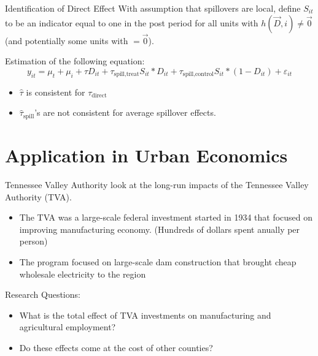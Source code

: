 \documentclass[aspectratio=169,t]{beamer}
\begin{document}
\begin{frame}{Identification of Direct Effect}
    With assumption that spillovers are local, define $S_{it}$ to be an indicator equal to one in the post period for all units with $h(\vec{D}, i) \neq \vec{0}$ (and potentially some units with $= \vec{0}$).

    \vspace{5mm}
    Estimation of the following equation:
    \[ 
        y_{it} = \mu_t + \mu_i + \tau D_{it} + \tau_{\text{spill,treat}} S_{it} * D_{it} + \tau_{\text{spill,control}} S_{it} * (1-D_{it}) + \varepsilon_{it}
    \]

    \begin{itemize}
        \item $\hat{\tau}$ is consistent for $\tau_{\text{direct}}$
        
        \item $\hat{\tau}_{\text{spill}}$'s are not consistent for average spillover effects.
    \end{itemize}

\end{frame}

\section{Application in Urban Economics}

\begin{frame}{Tennessee Valley Authority}
    \citet{Kline_Moretti_2014a} look at the long-run impacts of the Tennessee Valley Authority (TVA).

    \begin{itemize}
        \item The TVA was a large-scale federal investment started in 1934 that focused on improving manufacturing economy. (Hundreds of dollars spent anually per person)
        
        \item The program focused on large-scale dam construction that brought cheap wholesale electricity to the region
    \end{itemize}

    \pause
    Research Questions:
    \begin{itemize}
        \item What is the total effect of TVA investments on manufacturing and agricultural employment?
        \item Do these effects come at the cost of other counties?
    \end{itemize}
\end{frame}
\end{document}
